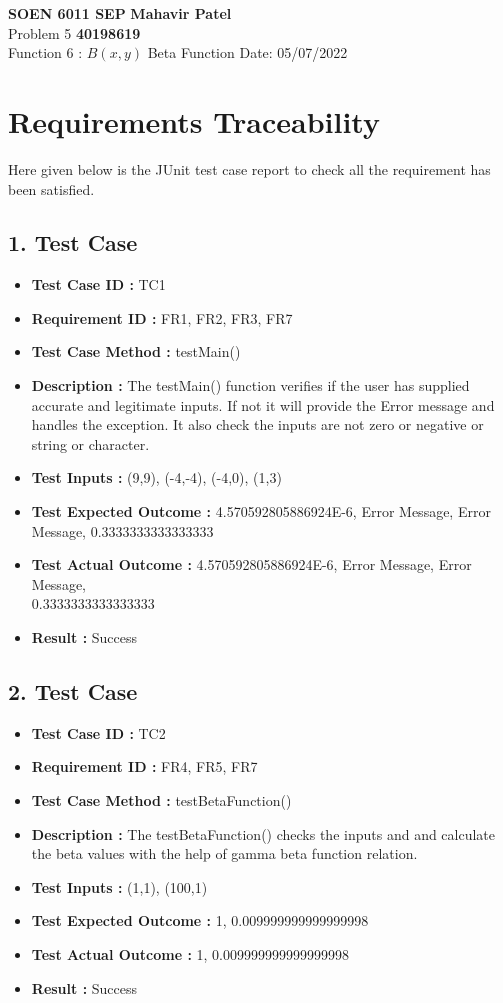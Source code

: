 \documentclass[a4paper, 12pt]{article}
\begin{document}
\noindent
\large\textbf{SOEN 6011 SEP} \hfill \textbf{Mahavir Patel} \\
\normalsize Problem 5 \hfill \textbf{40198619} \\
Function 6 :  $B(x,y)$ Beta Function \hfill Date: 05/07/2022 \\

\section*{Requirements Traceability}
Here given below is the JUnit test case report to check all the requirement has been satisfied.
\subsection*{1. Test Case}
    \begin{itemize}
        \item \textbf{Test Case ID : } TC1
        \item \textbf{Requirement ID : } FR1, FR2, FR3, FR7
        \item \textbf{Test Case Method : } testMain()
        \item \textbf{Description : } The testMain() function verifies if the user has supplied accurate and legitimate inputs. If not it will provide the Error message and handles the exception. It also check the inputs are not zero or negative or string or character. 
        \item \textbf{Test Inputs : }(9,9), (-4,-4), (-4,0), (1,3)
        \item \textbf{Test Expected Outcome : }4.570592805886924E-6, Error Message, Error Message, 0.3333333333333333
        \item \textbf{Test Actual Outcome : }4.570592805886924E-6, Error Message, Error Message,\\ 0.3333333333333333 
        \item \textbf{Result : }Success
    \end{itemize}

\subsection*{2. Test Case}
    \begin{itemize}
        \item \textbf{Test Case ID : } TC2
        \item \textbf{Requirement ID : } FR4, FR5, FR7
        \item \textbf{Test Case Method : } testBetaFunction()
        \item \textbf{Description : } The testBetaFunction() checks the inputs and and calculate the beta values with the help of gamma beta function relation. 
        \item \textbf{Test Inputs : }(1,1), (100,1)
        \item \textbf{Test Expected Outcome : }1, 0.009999999999999998
        \item \textbf{Test Actual Outcome : }1, 0.009999999999999998 
        \item \textbf{Result : }Success
    \end{itemize}
\end{document}
